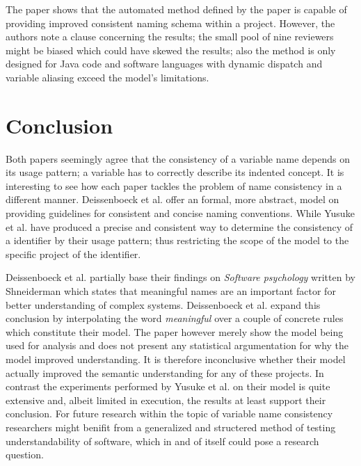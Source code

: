 \documentclass[a4paper,12pt]{article}
\begin{document}
\begin{multicols}{2}
    The paper shows that the automated method defined by the paper is capable of providing improved consistent naming
    schema within a project. However, the authors note a clause concerning the results; the small pool of nine
    reviewers
    might be biased which could have skewed the results; also the method is only designed for Java code and software
    languages with dynamic dispatch and variable aliasing exceed the model's limitations.

    \section*{Conclusion}
    Both papers seemingly agree that the consistency of a variable name depends on its usage pattern; a variable has
    to
    correctly describe its indented concept. It is interesting to see how each paper tackles the problem of name
    consistency in a different manner. Deissenboeck et al. offer an formal, more abstract, model on providing
    guidelines
    for consistent and concise naming conventions.\cite{deisenbock_concise_2005} While Yusuke et al. have produced a
    precise and consistent way to determine the consistency of a identifier by their usage pattern; thus restricting
    the
    scope of the model to the specific project of the identifier.\cite{shinyama_improving_2021}

    Deissenboeck et al. partially base their findings on \textit{Software psychology} written by Shneiderman which
    states
    that meaningful names are an important factor for better understanding of complex
    systems.\cite{schneiderman_software_1980} Deissenboeck et al. expand this conclusion by interpolating the word
    \textit{meaningful} over a couple of concrete rules which constitute their model.\cite{deisenbock_concise_2005} The
    paper however merely show the model being used for analysis and does not present any statistical argumentation for
    why
    the model improved understanding. It is therefore inconclusive whether their model actually improved the semantic
    understanding for any of these projects. In contrast the experiments performed by Yusuke et al. on their model is
    quite
    extensive and, albeit limited in execution, the results at least support their conclusion. For future research
    within
    the topic of variable name consistency researchers might benifit from a generalized and structered method of
    testing
    understandability of software, which in and of itself could pose a research question.


\end{multicols}
\end{document}
